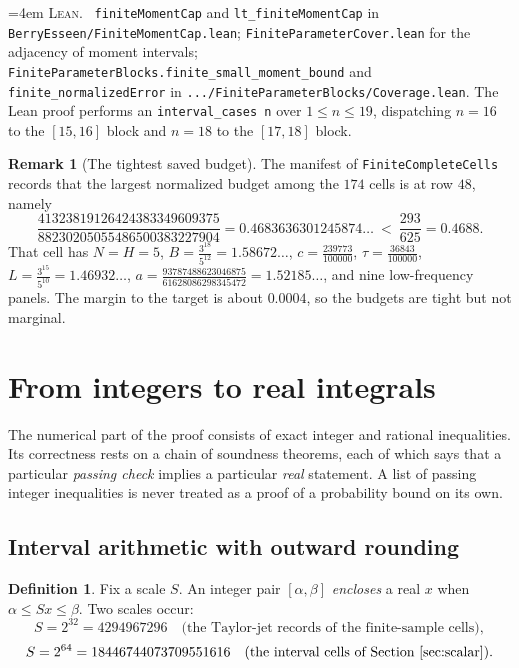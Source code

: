 \documentclass[10pt,a4paper]{article}
\theoremstyle{plain}
\theoremstyle{definition}
\newtheorem{definition}[theorem]{Definition}
\newtheorem{remark}[theorem]{Remark}
\newcommand{\lean}[1]{\texttt{#1}}
\newcommand{\file}[1]{\texttt{#1}}
\newenvironment{leanref}%
  {\par\addvspace{3pt}\begingroup\sloppy\emergencystretch=4em
   \noindent\footnotesize\textsc{Lean.}\ \ignorespaces}%
  {\par\endgroup\addvspace{3pt}}
\begin{document}
\begin{leanref}
\lean{finiteMomentCap} and \lean{lt\_finiteMomentCap} in
\file{BerryEsseen/FiniteMomentCap.lean};
\lean{FiniteParameterCover.lean} for the adjacency of moment intervals;
\lean{FiniteParameterBlocks.finite\_small\_moment\_bound} and
\lean{finite\_normalizedError} in
\file{.../FiniteParameterBlocks/Coverage.lean}. The Lean proof performs an
\lean{interval\_cases n} over $1\le n\le19$, dispatching $n=16$ to the
$[15,16]$ block and $n=18$ to the $[17,18]$ block.
\end{leanref}

\begin{remark}[The tightest saved budget]
The manifest of \file{FiniteCompleteCells} records that the largest normalized
budget among the $174$ cells is at row $48$, namely
\[
  \frac{41323819126424383349609375}{88230205055486500383227904}
  = 0.4683636301245874\ldots \ <\ \frac{293}{625}=0.4688 .
\]
That cell has $N=H=5$, $B=\tfrac{3^{18}}{5^{12}}=1.58672\ldots$,
$c=\tfrac{239773}{100000}$, $\tau=\tfrac{36843}{100000}$,
$L=\tfrac{3^{15}}{5^{10}}=1.46932\ldots$,
$a=\tfrac{93787488623046875}{61628086298345472}=1.52185\ldots$, and nine
low-frequency panels. The margin to the target is about $0.0004$, so the
budgets are tight but not marginal.
\end{remark}

\section{From integers to real integrals}
\label{sec:numerics}

The numerical part of the proof consists of exact integer and rational
inequalities. Its correctness rests on a chain of soundness theorems, each of
which says that a particular \emph{passing check} implies a particular
\emph{real} statement. A list of passing integer inequalities is never treated
as a proof of a probability bound on its own.

\subsection{Interval arithmetic with outward rounding}

\begin{definition}\label{def:interval}
Fix a scale $S$. An integer pair $[\alpha,\beta]$ \emph{encloses} a real $x$
when $\alpha\le Sx\le\beta$. Two scales occur:
\[
  S = 2^{32} = 4294967296
  \quad\text{(the Taylor-jet records of the finite-sample cells)},
\]
\[
  S = 2^{64} = 18446744073709551616
  \quad\text{(the interval cells of Section~\ref{sec:scalar})}.
\]
\end{definition}
\end{document}
